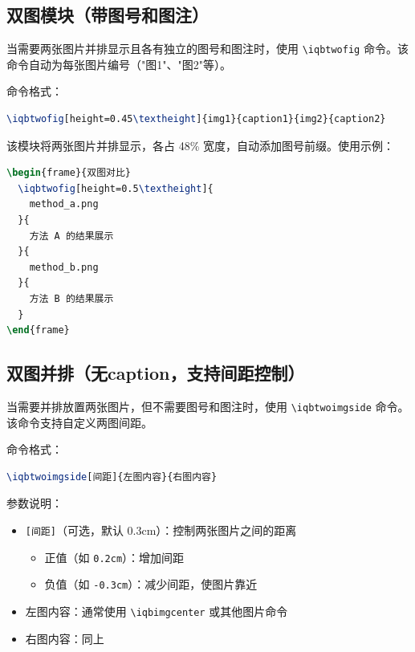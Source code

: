 \subsection{双图模块（带图号和图注）}

当需要两张图片并排显示且各有独立的图号和图注时，使用 \lstinline|\iqbtwofig| 命令。该命令自动为每张图片编号（"图1"、"图2"等）。

命令格式：

\begin{lstlisting}[style=blockstyle,language=TeX]
\iqbtwofig[height=0.45\textheight]{img1}{caption1}{img2}{caption2}
\end{lstlisting}

该模块将两张图片并排显示，各占 48\% 宽度，自动添加图号前缀。使用示例：

\begin{lstlisting}[style=blockstyle,language=TeX]
\begin{frame}{双图对比}
  \iqbtwofig[height=0.5\textheight]{
    method_a.png
  }{
    方法 A 的结果展示
  }{
    method_b.png
  }{
    方法 B 的结果展示
  }
\end{frame}
\end{lstlisting}

\subsection{双图并排（无caption，支持间距控制）}

当需要并排放置两张图片，但不需要图号和图注时，使用 \lstinline|\iqbtwoimgside| 命令。该命令支持自定义两图间距。

命令格式：

\begin{lstlisting}[style=blockstyle,language=TeX]
\iqbtwoimgside[间距]{左图内容}{右图内容}
\end{lstlisting}

参数说明：
\begin{itemize}
  \item \texttt{[间距]}（可选，默认 0.3cm）：控制两张图片之间的距离
  \begin{itemize}
    \item 正值（如 \texttt{0.2cm}）：增加间距
    \item 负值（如 \texttt{-0.3cm}）：减少间距，使图片靠近
  \end{itemize}
  \item 左图内容：通常使用 \lstinline|\iqbimgcenter| 或其他图片命令
  \item 右图内容：同上
\end{itemize}

